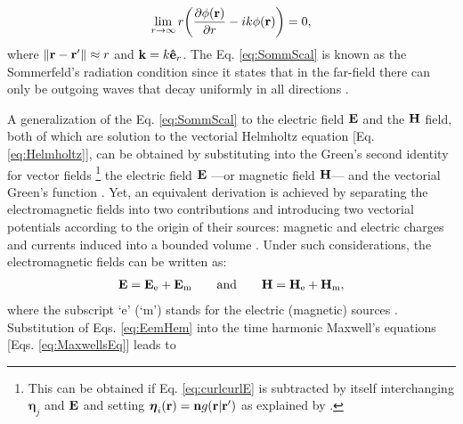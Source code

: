 %
%
%
%
\begin{align}
    \lim_{r\to \infty} r\qty(\pdv{\phi(\vb{r})}{r} - ik\phi(\vb{r})) = 0,
    \label{eq:SommScal}
\end{align}
%
where $\norm{\vb{r}-\vb{r}'} \approx r$ and $\vb{k} = k \vu{e}_r$. The Eq. \eqref{eq:SommScal} is known as the Sommerfeld's radiation condition since it states that in the far-field there can only be outgoing waves that decay uniformly in all directions \cite{schot_eighty_1992,jin_theory_2010,bondeson_computational_2005}.

A generalization of the Eq. \eqref{eq:SommScal} to the electric field $\vb{E}$ and the $\vb{H}$ field, both of which are solution to the vectorial Helmholtz equation [Eq. \eqref{eq:Helmholtz}], can be obtained by substituting into the Green's second identity for vector fields%
	\footnote{%
    This can be obtained if  Eq. \eqref{eq:curlcurlE} is subtracted by itself interchanging $\boldsymbol{\eta}_j $ and $\vb{E}$ and setting $\boldsymbol{\eta}_i(\vb{r}) = \vb{n}g(\vb{r}|\vb{r}')$ as explained by \citeauthor{stratton_diffraction_1939} \cite{stratton_diffraction_1939}.}%
    the electric field  $\vb{E}$ ---or magnetic field $\vb{H}$--- and the vectorial Green's function \cite{schot_eighty_1992,silver_microwave_1984,colton_inverse_2019}. Yet, an equivalent derivation is achieved by separating the electromagnetic fields into two contributions and introducing  two vectorial potentials according to the origin of their sources: magnetic and electric  charges and currents induced into a bounded volume \cite{jin_theory_2010,bondeson_computational_2005}. Under such considerations, the electromagnetic fields can be written as:
%
\begin{align}
\vb{E} = \vb{E}_\text{e} + \vb{E}_\text{m}
    \qquad
    \text{and}
    \qquad
\vb{H} = \vb{H}_\text{e} + \vb{H}_\text{m},
\label{eq:EemHem}
\end{align}
%
where the subscript `e' (`m') stands for the electric (magnetic) sources \cite{jin_theory_2010}. Substitution of Eqs. \eqref{eq:EemHem} into the time harmonic Maxwell's equations [Eqs. \eqref{eq:MaxwellsEq}] leads to
%
%
%
